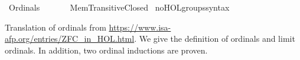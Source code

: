 %
\begin{isabellebody}%
%
%
\isadelimdocument
%
\endisadelimdocument
%
\isatagdocument
\isanewline
%
\isamarkuptrue%
%
\endisatagdocument
{\isafolddocument}%
%
\isadelimdocument
%
\endisadelimdocument
%
\isadelimtheory
%
\endisadelimtheory
%
\isatagtheory
{}\isamarkupfalse%
\ Ordinals\isanewline
\ \ \isanewline
\ \ \ \ Mem{\isacharunderscore}{\kern0pt}Transitive{\isacharunderscore}{\kern0pt}Closed\isanewline
{}%
\endisatagtheory
{\isafoldtheory}%
%
\isadelimtheory
\isanewline
%
\endisadelimtheory
\isanewline
{}\isamarkupfalse%
\ no{\isacharunderscore}{\kern0pt}HOL{\isacharunderscore}{\kern0pt}groups{\isacharunderscore}{\kern0pt}syntax%
\isadelimdocument
%
\endisadelimdocument
%
\isatagdocument
%
\isamarkuptrue%
%
\endisatagdocument
{\isafolddocument}%
%
\isadelimdocument
%
\endisadelimdocument
%
\begin{isamarkuptext}%
Translation of ordinals from \url{https://www.isa-afp.org/entries/ZFC_in_HOL.html}.
We give the definition of ordinals and limit ordinals. In addition,
two ordinal inductions are proven.


\end{isamarkuptext}
\end{isabellebody}

